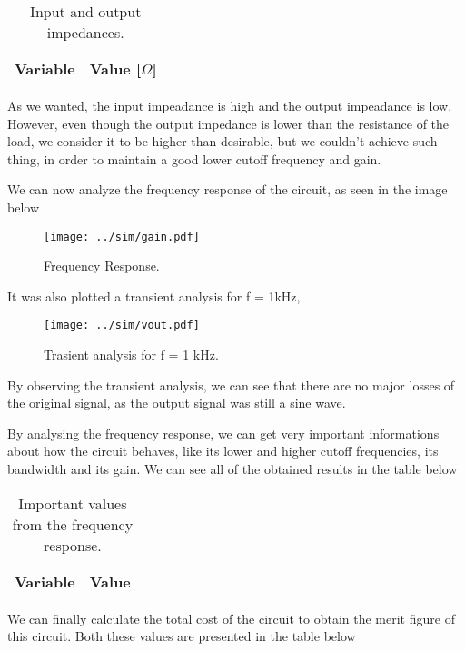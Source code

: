 \begin{table}[H]
  \centering
  \begin{tabular}{|l|r|}
    \hline    
    {\bf Variable} & {\bf Value [$\Omega$]} \\ \hline
    
    
  \end{tabular}
  \caption{Input and output impedances.}
\end{table}

As we wanted, the input impeadance is high and the output impeadance is low. However, even though the output impedance is lower than the resistance of the load, we consider it to be higher than desirable, but we couldn't achieve such thing, in order to maintain a good lower cutoff frequency and gain.

We can now analyze the frequency response of the circuit, as seen in the image below

\begin{figure}[H] \centering
\texttt{[image: ../sim/gain.pdf]}
\caption{Frequency Response.}
\end{figure}



It was also plotted a transient analysis for f = 1kHz, 

\begin{figure}[H] \centering
\texttt{[image: ../sim/vout.pdf]}
\caption{Trasient analysis for f = 1 kHz.}
\end{figure}

By observing the transient analysis, we can see that there are no major losses of the original signal, as the output signal was still a sine wave.
\par
By analysing the frequency response, we can get very important informations about how the circuit behaves, like its lower and higher cutoff frequencies, its bandwidth and its gain. We can see all of the obtained results in the table below

\begin{table}[H]
  \centering
  \begin{tabular}{|l|r|}
    \hline    
    {\bf Variable} & {\bf Value} \\ \hline
    
  \end{tabular}
  \caption{Important values from the frequency response.}
\end{table}

We can finally calculate the total cost of the circuit to obtain the merit figure of this circuit. Both these values are presented in the table below

